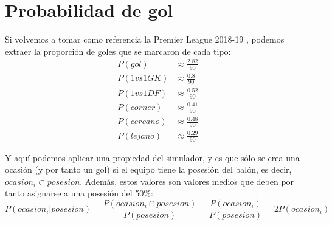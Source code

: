 \documentclass[a4paper,9pt]{article}
\begin{document}
\section{Probabilidad de gol}\label{sec:ProbGol}
\def \Pgol {\ensuremath{\frac{2.82}{90}}}
\def \PGvsGK {\ensuremath{\frac{0.8}{90}}}
\def \PGvsDF {\ensuremath{\frac{0.52}{90}}}
\def \PGcorner {\ensuremath{\frac{0.41}{90}}}
\def \PGclose {\ensuremath{\frac{0.48}{90}}}
\def \PGfar {\ensuremath{\frac{0.29}{90}}}
Si volvemos a tomar como referencia la Premier League 2018-19 \cite{PremierLeague}, podemos extraer la proporción de goles que se marcaron de cada tipo:
\begin{align}
	P(gol)&\approx\Pgol\\
	P(1vs1GK)&\approx\PGvsGK\\
	P(1vs1DF)&\approx\PGvsDF\\
	P(corner)&\approx\PGcorner\\
	P(cercano)&\approx\PGclose\\
	P(lejano)&\approx\PGfar
\end{align}

Y aquí podemos aplicar una propiedad del simulador, y es que sólo se crea una ocasión (y por tanto un gol) si el equipo tiene la posesión del balón, es decir, $ocasion_i\subset posesion$. Además, estos valores son valores medios que deben por tanto asignarse a una posesión del 50\%:
\begin{equation}\label{eq:proboccomp}
	P(ocasion_i|posesion)=\frac{P(ocasion_i\cap posesion)}{P(posesion)}=\frac{P(ocasion_i)}{P(posesion)}=2P(ocasion_i)
\end{equation}
\end{document}
